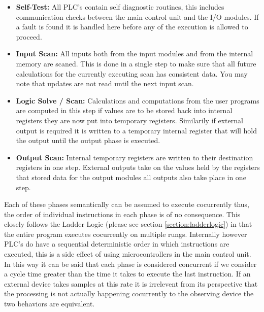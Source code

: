\begin{itemize}
	\item\textbf{Self-Test:} All PLC's contain self diagnostic routines, this includes communication checks between the main control unit and the I/O modules. If a fault is found it is handled here before any of the execution is allowed to proceed.
	\item\textbf{Input Scan:} All inputs both from the input modules and from the internal memory are scaned. This is done in a single step to make sure that all future calculations for the currently executing scan has consistent data. You may note that updates are not read until the next input scan.
	\item\textbf{Logic Solve / Scan:} Calculations and computations from the user programs are computed in this step if values are to be stored back into internal registers they are now put into temporary registers. Similarily if external output is required it is written to a temporary internal register that will hold the output until the output phase is executed.
	\item\textbf{Output Scan:} Internal temporary registers are written to their destination registers in one step. External outputs take on the values held by the registers that stored data for the output modules all outputs also take place in one step.
\end{itemize}


Each of these phases semantically can be assumed to execute cocurrently thus, the order of individual instructions in each phase is of no consequence. This closely follows the Ladder Logic (please see section \ref{section:ladderlogic}) in that the entire program executes cocurrently on multiple rungs. Internally however PLC's do have a sequential deterministic order in which instructions are executed, this is a side effect of using microcontrollers in the main control unit. In this way it can be said that each phase is considered concurrent if we consider a cycle time greater than the time it takes to execute the last instruction. If an external device takes samples at this rate it is irrelevent from its perspective that the processing is not actually happening cocurrently to the observing device the two behaviors are equivalent.


